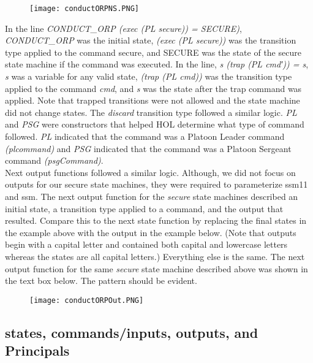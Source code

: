   \begin{figure}[h]
  \centering
  \texttt{[image: conductORPNS.PNG]}
\end{figure}

In the line \emph{CONDUCT_ORP (exec (PL secure)) = SECURE)}, \emph{CONDUCT_ORP} was the initial state, \emph{(exec (PL secure))} was the transition type applied to the command secure, and SECURE was the state of the secure state machine if the command was executed.  In the line, \emph{s (trap (PL cmd′)) = s}, \emph{s} was a variable for any valid state, \emph{(trap (PL cmd))} was the transition type applied to the command \emph{cmd}, and \emph{s} was the state after the trap command was applied.  Note that trapped transitions were not allowed and the state machine did not change states.  The \emph{discard} transition type followed a similar logic.  \emph{PL} and \emph{PSG} were constructors that helped HOL determine what type of command followed. \emph{PL} indicated that the command was a Platoon Leader command \emph{(plcommand)} and \emph{PSG} indicated that the command was a Platoon Sergeant command \emph{(psgCommand)}.  \\
  
Next output functions followed a similar logic.  Although, we did not focus on outputs for our secure state machines, they were required to parameterize ssm11 and ssm.  The next output function for the \emph{secure} state machines described an initial state, a transition type applied to a command, and the output that resulted.  Compare this to the next state function by replacing the final states in the example above with the output in the example below.  (Note that outputs begin with a capital letter and contained both capital and lowercase letters whereas the states are all capital letters.)  Everything else is the same.    The next output function for the same \emph{secure} state machine described above was shown in the text box below.   The pattern should be evident.\\
  
  \begin{figure}[h]
  \centering
  \texttt{[image: conductORPOut.PNG]}
\end{figure}


\subsection{states, commands/inputs, outputs, and Principals}
\label{sec:stat-comm-outp}

